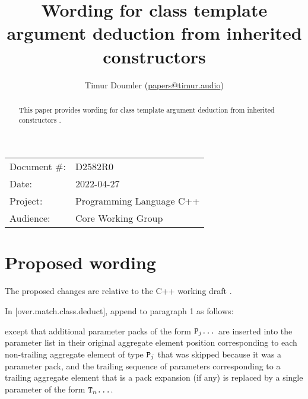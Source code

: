 

\newcommand{\forceindent}{\parindent=1em\indent\parindent=0pt\relax} %



\title{Wording for class template argument deduction from inherited constructors}
\author{
  Timur Doumler \small(\href{mailto:papers@timur.audio}{papers@timur.audio})
}
\date{}
\maketitle

\begin{tabular}{ll}
Document \#: & D2582R0 \\
Date: & 2022-04-27\\
Project: & Programming Language C++ \\
Audience: & Core Working Group
\end{tabular}


\begin{abstract}
This paper provides wording for class template argument deduction from inherited constructors \cite{P1021R5}.
\end{abstract}

\section{Proposed wording}

The proposed changes are relative to the C++ working draft \cite{N4910}. 

In [over.match.class.deduct], append to paragraph 1 as follows:

\begin{adjustwidth}{0.5cm}{0.5cm}
except that additional parameter packs of the form $\texttt{P}_j \texttt{...}$
are inserted into the parameter list in their original aggregate element position corresponding to each non-trailing aggregate element of type $\texttt{P}_j$
that was skipped because it was a parameter pack, and
the trailing sequence of parameters corresponding
to a trailing aggregate element that is a pack expansion (if any)
is replaced by a single parameter of the form $\texttt{T}_n \texttt{...}$.

\end{adjustwidth}

